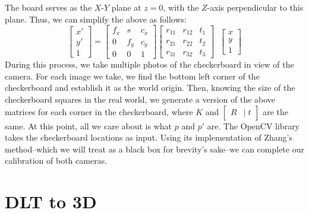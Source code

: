 \documentclass[
    12pt,
    twoside,
    bibstyle=chicago,
    headerstyle=uppercase,
	bibfile=biblatex_updating.bib
]{reedthesis}
\newcommand{\rt}{\left[\begin{smallmatrix}R &|\; t\end{smallmatrix}\right]}
\begin{document}

The board serves as the $X$-$Y$ plane at $z=0$, with the $Z$-axis perpendicular to this plane. Thus, we can simplify the above as follows:
\[\begin{bmatrix}x' \\ y' \\ 1\end{bmatrix} = \begin{bmatrix}f_x & s & c_x \\ 0 & f_y & c_y \\ 0 & 0 & 1\end{bmatrix} \begin{bmatrix} r_{11}&r_{12}&t_{1}\\r_{21}&r_{22}&t_{2}\\r_{31}&r_{32}&t_{3}\end{bmatrix}\;\;\begin{bmatrix}x \\ y \\ 1\end{bmatrix} \]
During this process, we take multiple photos of the checkerboard in view of the camera. For each image we take, we find the bottom left corner of the checkerboard and establish it as the world origin. Then, knowing the size of the checkerboard squares in the real world, we generate a version of the above matrices for each corner in the checkerboard, where $K$ and $\rt$ are the same. At this point, all we care about is what $p$ and $p'$ are. The OpenCV library takes the checkerboard locations as input. Using its implementation of Zhang's method--which we will treat as a black box for brevity's sake--we can complete our calibration of both cameras.


\section{DLT to 3D}
\end{document}
